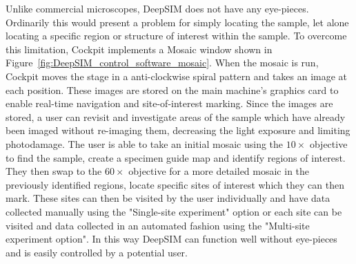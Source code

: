 Unlike commercial microscopes, DeepSIM does not have any eye-pieces. Ordinarily this would present a problem for simply locating the sample, let alone locating a specific region or structure of interest within the sample. To overcome this limitation, Cockpit implements a Mosaic window shown in Figure~\ref{fig:DeepSIM_control_software_mosaic}. When the mosaic is run, Cockpit moves the stage in a anti-clockwise spiral pattern and takes an image at each position. These images are stored on the main machine's graphics card to enable real-time navigation and site-of-interest marking. Since the images are stored, a user can revisit and investigate areas of the sample which have already been imaged without re-imaging them, decreasing the light exposure and limiting photodamage. The user is able to take an initial mosaic using the $10\times$ objective to find the sample, create a specimen guide map and identify regions of interest. They then swap to the $60\times$ objective for a more detailed mosaic in the previously identified regions, locate specific sites of interest which they can then mark. These sites can then be visited by the user individually and have data collected manually using the "Single-site experiment" option or each site can be visited and data collected in an automated fashion using the "Multi-site experiment option". In this way DeepSIM can function well without eye-pieces and is easily controlled by a potential user.
